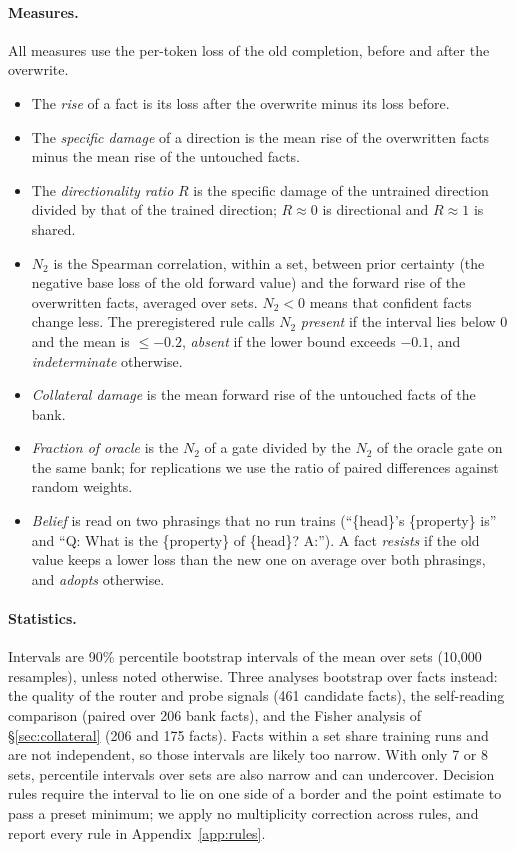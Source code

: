 \documentclass[11pt]{article}
\newcommand{\NTwo}{\ensuremath{N_2}}
\begin{document}
\paragraph{Measures.}
All measures use the per-token loss of the old completion, before and after the overwrite.
\begin{itemize}
  \item The \emph{rise} of a fact is its loss after the overwrite minus its loss before.
  \item The \emph{specific damage} of a direction is the mean rise of the overwritten facts minus the mean rise of the untouched facts.
  \item The \emph{directionality ratio} $R$ is the specific damage of the untrained direction divided by that of the trained direction; $R\approx0$ is directional and $R\approx1$ is shared.
  \item \NTwo{} is the Spearman correlation, within a set, between prior certainty (the negative base loss of the old forward value) and the forward rise of the overwritten facts, averaged over sets. $\NTwo<0$ means that confident facts change less. The preregistered rule calls \NTwo{} \emph{present} if the interval lies below 0 and the mean is $\le -0.2$, \emph{absent} if the lower bound exceeds $-0.1$, and \emph{indeterminate} otherwise.
  \item \emph{Collateral damage} is the mean forward rise of the untouched facts of the bank.
  \item \emph{Fraction of oracle} is the \NTwo{} of a gate divided by the \NTwo{} of the oracle gate on the same bank; for replications we use the ratio of paired differences against random weights.
  \item \emph{Belief} is read on two phrasings that no run trains (``\{head\}'s \{property\} is'' and ``Q: What is the \{property\} of \{head\}? A:''). A fact \emph{resists} if the old value keeps a lower loss than the new one on average over both phrasings, and \emph{adopts} otherwise.
\end{itemize}

\paragraph{Statistics.}
Intervals are 90\% percentile bootstrap intervals of the mean over sets (10{,}000 resamples), unless noted otherwise.
Three analyses bootstrap over facts instead: the quality of the router and probe signals (461 candidate facts), the self-reading comparison (paired over 206 bank facts), and the Fisher analysis of \S\ref{sec:collateral} (206 and 175 facts). Facts within a set share training runs and are not independent, so those intervals are likely too narrow.
With only 7 or 8 sets, percentile intervals over sets are also narrow and can undercover.
Decision rules require the interval to lie on one side of a border and the point estimate to pass a preset minimum; we apply no multiplicity correction across rules, and report every rule in Appendix~\ref{app:rules}.
\end{document}

